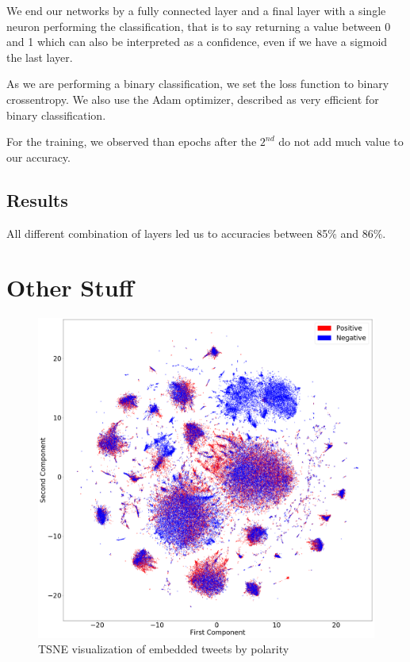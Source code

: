 \documentclass[10pt,conference,compsocconf,retainorgcmds]{IEEEtran}
\begin{document}
We end our networks by a fully connected layer and a final layer with a single neuron performing the classification, that is to say returning a value between 0 and 1 which can also be interpreted as a confidence, even if we have a sigmoid the last layer.

As we are performing a binary classification, we set the loss function to binary crossentropy. We also use the Adam optimizer, described as very efficient for binary classification.

For the training, we observed than epochs after the $2^{nd}$ do not add much value to our accuracy.

\subsection{Results}

All different combination of layers led us to accuracies between 85\% and 86\%.

\section{Other Stuff}
\begin{figure}[h]
    \centering
    \includegraphics[width=\linewidth]{imag/tweets_tsne.png}
    \caption{TSNE visualization of embedded tweets by polarity}
    \label{fig:my_label}
\end{figure}
\end{document}
